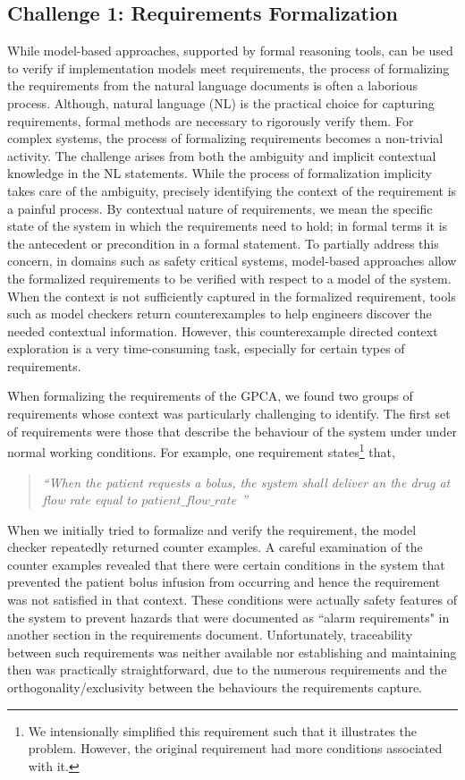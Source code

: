 \subsection{Challenge 1: Requirements Formalization}

While model-based approaches, supported by formal reasoning tools, can be used to verify if implementation models meet requirements, the process of formalizing the requirements from the natural language documents is often a laborious process. Although, natural language (NL) is the practical choice for capturing requirements, formal methods are necessary to rigorously verify them. For complex systems, the process of formalizing requirements becomes a non-trivial activity. The challenge arises from both the ambiguity and implicit contextual knowledge in the NL statements. While the process of formalization implicity takes care of the ambiguity, precisely identifying the context of the requirement is a painful process. By contextual nature of requirements, we mean the specific state of the system in which the requirements need to hold; in formal terms it is the antecedent or precondition in a formal statement. To partially address this concern, in domains such as safety critical systems, model-based approaches allow the formalized requirements to be verified with respect to a model of the system. When the context is not sufficiently captured in the formalized requirement, tools such as model checkers return counterexamples to help engineers discover the needed contextual information. However, this counterexample directed context exploration is a very time-consuming task, especially for certain types of requirements.

When formalizing the requirements of the GPCA, we found two groups of requirements whose context was particularly challenging to identify. The first set of requirements were those that describe the behaviour of the system under under normal working conditions. For example, one requirement states\footnote{\scriptsize{We intensionally simplified this requirement such that it illustrates the problem. However, the original requirement had more conditions associated with it.}} that,

\begin{quotation}
\emph{``When the patient requests a bolus, the system shall deliver an the drug at flow rate equal to $patient\_flow\_rate$ ''}
\end{quotation}

When we initially tried to formalize and verify the requirement, the model checker repeatedly returned counter examples. A careful examination of the counter examples revealed that there were certain conditions in the system that prevented the patient bolus infusion from occurring and hence the requirement was not satisfied in that context. These conditions were actually safety features of the system to prevent hazards that were documented as ``alarm requirements" in another section in the requirements document.  Unfortunately, traceability between such requirements was neither available nor establishing and maintaining then was practically straightforward, due to the numerous requirements and the orthogonality/exclusivity between the behaviours the requirements capture.

